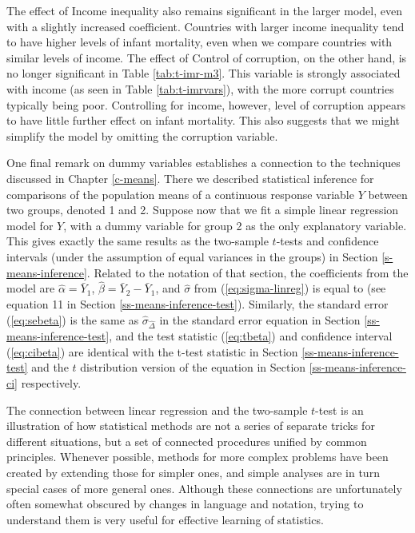 \documentclass[11pt,a4paper,openany]{book}
\begin{document}
The effect of Income inequality also remains significant in the larger
model, even with a slightly increased coefficient. Countries with larger
income inequality tend to have higher levels of infant mortality, even
when we compare countries with similar levels of income. The effect of
Control of corruption, on the other hand, is no longer significant in
Table \ref{tab:t-imr-m3}. This variable is strongly associated with
income (as seen in Table \ref{tab:t-imrvars}), with the more corrupt
countries typically being poor. Controlling for income, however, level
of corruption appears to have little further effect on infant mortality.
This also suggests that we might simplify the model by omitting the
corruption variable.

One final remark on dummy variables establishes a connection to the
techniques discussed in Chapter \ref{c-means}. There we described
statistical inference for comparisons of the population means of a
continuous response variable \(Y\) between two groups, denoted 1 and 2.
Suppose now that we fit a simple linear regression model for \(Y\), with
a dummy variable for group 2 as the only explanatory variable. This
gives exactly the same results as the two-sample \(t\)-tests and
confidence intervals (under the assumption of equal variances in the
groups) in Section \ref{s-means-inference}. Related to the notation of
that section, the coefficients from the model are
\(\hat{\alpha}=\bar{Y}_{1}\), \(\hat{\beta}=\bar{Y}_{2}-\bar{Y}_{1}\),
and \(\hat{\sigma}\) from (\ref{eq:sigma-linreg}) is equal to (see
equation 11 in Section \ref{ss-means-inference-test}). Similarly, the
standard error (\ref{eq:sebeta}) is the same as
\(\hat{\sigma}_{\hat{\Delta}}\) in the standard error equation in
Section \ref{ss-means-inference-test}, and the test statistic
(\ref{eq:tbeta}) and confidence interval (\ref{eq:cibeta}) are identical
with the t-test statistic in Section \ref{ss-means-inference-test} and
the \(t\) distribution version of the equation in Section
\ref{ss-means-inference-ci} respectively.

The connection between linear regression and the two-sample \(t\)-test
is an illustration of how statistical methods are not a series of
separate tricks for different situations, but a set of connected
procedures unified by common principles. Whenever possible, methods for
more complex problems have been created by extending those for simpler
ones, and simple analyses are in turn special cases of more general
ones. Although these connections are unfortunately often somewhat
obscured by changes in language and notation, trying to understand them
is very useful for effective learning of statistics.
\end{document}

